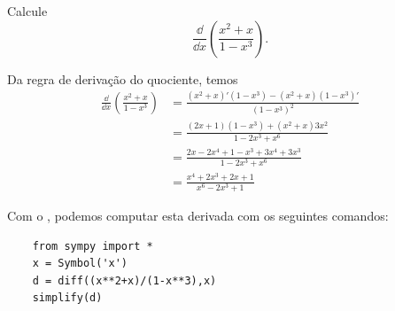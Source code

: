 \begin{exeresol}
  Calcule
  \begin{equation}
    \frac{\dd}{\dd x}\left(\frac{x^2+x}{1-x^3}\right).
  \end{equation}
\end{exeresol}
\begin{resol}
  Da regra de derivação do quociente, temos
  \begin{align}
    \frac{\dd}{\dd x}\left(\frac{x^2+x}{1-x^3}\right) &= \frac{(x^2+x)'(1-x^3)-(x^2+x)(1-x^3)'}{(1-x^3)^2}\\
                                                      &= \frac{(2x+1)(1-x^3)+(x^2+x)3x^2}{1-2x^3+x^6} \\
                                                      &= \frac{2x-2x^4+1-x^3+3x^4+3x^3}{1-2x^3+x^6} \\
                                                      &= \frac{x^4+2x^3+2x+1}{x^6-2x^3+1}
  \end{align}
  
  \ifispython
  Com o \sympy, podemos computar esta derivada com os seguintes comandos:
  \begin{lstlisting}
    from sympy import *
    x = Symbol('x')
    d = diff((x**2+x)/(1-x**3),x)
    simplify(d)
  \end{lstlisting}
  \fi
\end{resol}

